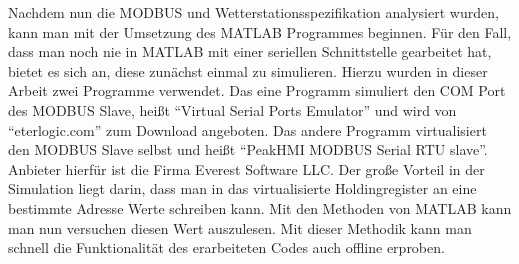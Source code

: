 Nachdem nun die MODBUS und Wetterstationsspezifikation analysiert wurden, kann man mit der Umsetzung des MATLAB Programmes beginnen. Für den Fall, dass man noch nie in MATLAB mit einer seriellen Schnittstelle gearbeitet hat, bietet es sich an, diese zunächst einmal zu simulieren. Hierzu wurden in dieser Arbeit zwei Programme verwendet. Das eine Programm simuliert den COM Port des MODBUS Slave, heißt \enquote{Virtual Serial Ports Emulator} und wird von \enquote{eterlogic.com} zum Download angeboten. Das andere Programm virtualisiert den MODBUS Slave selbst und heißt \enquote{PeakHMI MODBUS Serial RTU slave}. Anbieter hierfür ist die Firma Everest Software LLC. Der große Vorteil in der Simulation liegt darin, dass man in das virtualisierte Holdingregister an eine bestimmte Adresse Werte schreiben kann. Mit den Methoden von MATLAB kann man nun versuchen diesen Wert auszulesen. Mit dieser Methodik kann man schnell die Funktionalität des erarbeiteten Codes auch offline erproben.   
